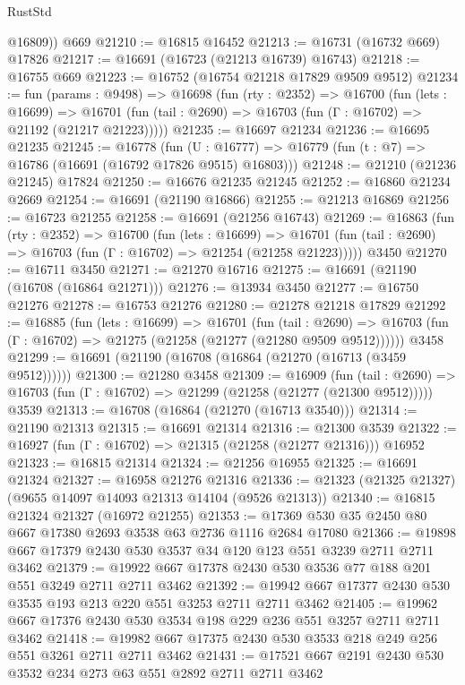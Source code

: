 \begin{lexlean}{RustStd}
\begin{coremodule}
        @16809))
    @669
@21210 := @16815 @16452
@21213 := @16731 (@16732 @669) @17826
@21217 := @16691 (@16723 (@21213 @16739) @16743)
@21218 := @16755 @669
@21223 := @16752 (@16754 @21218 @17829 @9509 @9512)
@21234 := fun (params : @9498) =>
  @16698
    (fun (rty : @2352) =>
    @16700
      (fun (lets : @16699) =>
      @16701 (fun (tail : @2690) => @16703 (fun (Γ : @16702) => @21192 (@21217 @21223)))))
@21235 := @16697 @21234
@21236 := @16695 @21235
@21245 := @16778
    (fun (U : @16777) => @16779 (fun (t : @7) => @16786 (@16691 (@16792 @17826 @9515) @16803)))
@21248 := @21210 (@21236 @21245) @17824
@21250 := @16676 @21235 @21245
@21252 := @16860 @21234 @2669
@21254 := @16691 (@21190 @16866)
@21255 := @21213 @16869
@21256 := @16723 @21255
@21258 := @16691 (@21256 @16743)
@21269 := @16863
    (fun (rty : @2352) =>
    @16700
      (fun (lets : @16699) =>
      @16701 (fun (tail : @2690) => @16703 (fun (Γ : @16702) => @21254 (@21258 @21223)))))
    @3450
@21270 := @16711 @3450
@21271 := @21270 @16716
@21275 := @16691 (@21190 (@16708 (@16864 @21271)))
@21276 := @13934 @3450
@21277 := @16750 @21276
@21278 := @16753 @21276
@21280 := @21278 @21218 @17829
@21292 := @16885
    (fun (lets : @16699) =>
    @16701
      (fun (tail : @2690) =>
      @16703 (fun (Γ : @16702) => @21275 (@21258 (@21277 (@21280 @9509 @9512))))))
    @3458
@21299 := @16691 (@21190 (@16708 (@16864 (@21270 (@16713 (@3459 @9512))))))
@21300 := @21280 @3458
@21309 := @16909
    (fun (tail : @2690) => @16703 (fun (Γ : @16702) => @21299 (@21258 (@21277 (@21300 @9512)))))
    @3539
@21313 := @16708 (@16864 (@21270 (@16713 @3540)))
@21314 := @21190 @21313
@21315 := @16691 @21314
@21316 := @21300 @3539
@21322 := @16927 (fun (Γ : @16702) => @21315 (@21258 (@21277 @21316))) @16952
@21323 := @16815 @21314
@21324 := @21256 @16955
@21325 := @16691 @21324
@21327 := @16958 @21276 @21316
@21336 := @21323 (@21325 @21327) (@9655 @14097 @14093 @21313 @14104 (@9526 @21313))
@21340 := @16815 @21324 @21327 (@16972 @21255)
@21353 := @17369 @530 @35 @2450 @80 @667 @17380 @2693 @3538 @63 @2736 @1116 @2684 @17080
@21366 := @19898 @667 @17379 @2430 @530 @3537 @34 @120 @123 @551 @3239 @2711 @2711 @3462
@21379 := @19922 @667 @17378 @2430 @530 @3536 @77 @188 @201 @551 @3249 @2711 @2711 @3462
@21392 := @19942 @667 @17377 @2430 @530 @3535 @193 @213 @220 @551 @3253 @2711 @2711 @3462
@21405 := @19962 @667 @17376 @2430 @530 @3534 @198 @229 @236 @551 @3257 @2711 @2711 @3462
@21418 := @19982 @667 @17375 @2430 @530 @3533 @218 @249 @256 @551 @3261 @2711 @2711 @3462
@21431 := @17521 @667 @2191 @2430 @530 @3532 @234 @273 @63 @551 @2892 @2711 @2711 @3462

\end{coremodule}
\end{lexlean}
